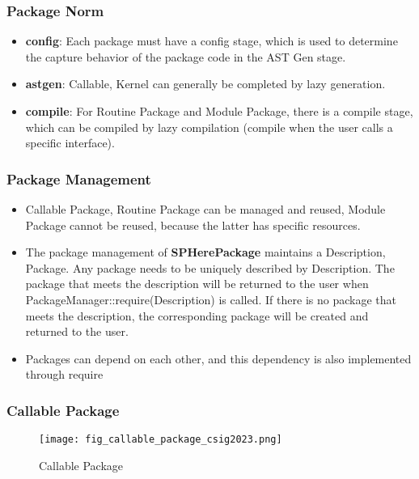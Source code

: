 \begin{frame}
    \frametitle{Package Norm}
    \begin{itemize}
        \item \textbf{config}: Each package must have a config stage, which is used to determine the capture behavior of the package code in the AST Gen stage.
        \item \textbf{astgen}: Callable, Kernel can generally be completed by lazy generation.
        \item \textbf{compile}: For Routine Package and Module Package, there is a compile stage, which can be compiled by lazy compilation (compile when the user calls a specific interface).
    \end{itemize}
\end{frame}

\begin{frame}
    \frametitle{Package Management}
    \begin{itemize}
        \item Callable Package, Routine Package can be managed and reused, Module Package cannot be reused, because the latter has specific resources.
        \item The package management of \textbf{SPHerePackage} maintains a Description, Package. Any package needs to be uniquely described by Description. The package that meets the description will be returned to the user when PackageManager::require(Description) is called. If there is no package that meets the description, the corresponding package will be created and returned to the user.
        \item Packages can depend on each other, and this dependency is also implemented through require
    \end{itemize}
\end{frame}


\begin{frame}
    \frametitle{Callable Package}
    \begin{figure}[H]
        \centering
        \texttt{[image: fig\_callable\_package\_csig2023.png]}
        \caption{Callable Package}
        \label{fig:CallablePackage}
    \end{figure}
\end{frame}

